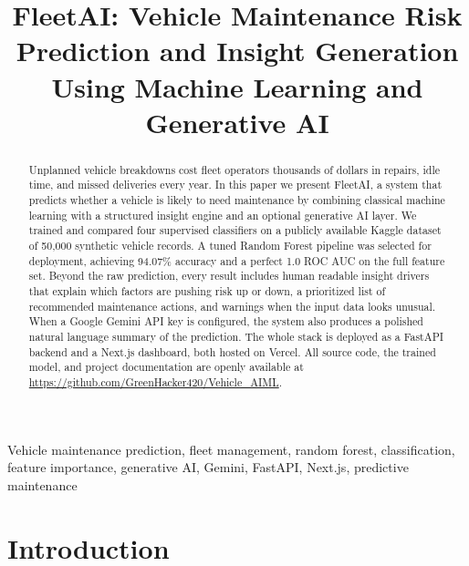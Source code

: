 \documentclass[conference]{IEEEtran}
\begin{document}
\title{FleetAI: Vehicle Maintenance Risk Prediction and Insight Generation Using Machine Learning and Generative AI}

\author{
}

\maketitle

\begin{abstract}
Unplanned vehicle breakdowns cost fleet operators thousands of dollars in repairs, idle time, and missed deliveries every year. In this paper we present FleetAI, a system that predicts whether a vehicle is likely to need maintenance by combining classical machine learning with a structured insight engine and an optional generative AI layer. We trained and compared four supervised classifiers on a publicly available Kaggle dataset of 50,000 synthetic vehicle records. A tuned Random Forest pipeline was selected for deployment, achieving 94.07\% accuracy and a perfect 1.0 ROC AUC on the full feature set. Beyond the raw prediction, every result includes human readable insight drivers that explain which factors are pushing risk up or down, a prioritized list of recommended maintenance actions, and warnings when the input data looks unusual. When a Google Gemini API key is configured, the system also produces a polished natural language summary of the prediction. The whole stack is deployed as a FastAPI backend and a Next.js dashboard, both hosted on Vercel. All source code, the trained model, and project documentation are openly available at \url{https://github.com/GreenHacker420/Vehicle_AIML}.
\end{abstract}

\begin{IEEEkeywords}
Vehicle maintenance prediction, fleet management, random forest, classification, feature importance, generative AI, Gemini, FastAPI, Next.js, predictive maintenance
\end{IEEEkeywords}

\section{Introduction}
\end{document}

